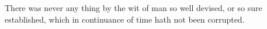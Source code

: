 \documentclass[MAIN]{subfiles}
\begin{document}
There was never any thing by the wit of man so well devised, or so sure established, which in continuance of time hath not been corrupted.
\end{document}
